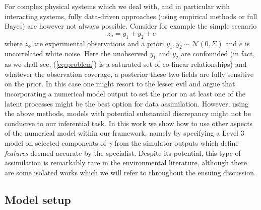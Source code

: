 \documentclass[10pt,a4paper]{article}
\begin{document}
For complex physical systems which we deal with, and in particular with interacting systems, fully data-driven approaches (using empirical methods or full Bayes) are however not always possible. Consider for example the simple scenario
\begin{equation}\label{eq:problem}
z_o = y_1 + y_2 + e
\end{equation}
\noindent where $z_o$ are experimental observations and a priori $y_1,y_2 \sim \mathcal{N}(0,{\Sigma})$ and $e$ is uncorrelated white noise. Here the unobserved $y_1$ and $y_2$ are confounded (in fact, as we shall see, (\ref{eq:problem}) is a saturated set of co-linear relationships) and whatever the observation coverage, a posterior these two fields are fully sensitive on the prior. In this case one might resort to the lesser evil and argue that incorporating a numerical model output to set the prior on at least one of the latent processes might be the best option for data assimilation. However, using the above methods, models with potential substantial discrepancy might not be conducive to our inferential task. In this work we show how to use other aspects of the numerical model within our framework, namely by specifying a Level 3 model on selected components of $\gamma$ from the simulator outputs which define \emph{features} deemed accurate by the specialist. Despite its potential, this type of assimilation is remarkably rare in the environmental literature, although there are some isolated works which we will refer to throughout the ensuing discussion.

\subsection{Model setup}
\end{document}
